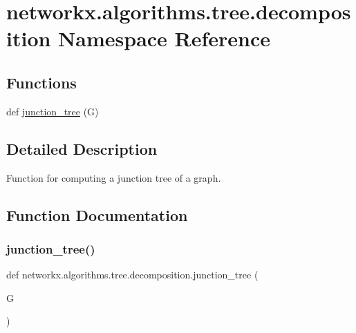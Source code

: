 \hypertarget{namespacenetworkx_1_1algorithms_1_1tree_1_1decomposition}{}\section{networkx.\+algorithms.\+tree.\+decomposition Namespace Reference}
\label{namespacenetworkx_1_1algorithms_1_1tree_1_1decomposition}
\subsection*{Functions}
\begin{DoxyCompactItemize}
\item 
def \hyperlink{namespacenetworkx_1_1algorithms_1_1tree_1_1decomposition_a91d970d1a653c7a4047624416258a661}{junction\+\_\+tree} (G)
\end{DoxyCompactItemize}


\subsection{Detailed Description}
\begin{DoxyVerb}Function for computing a junction tree of a graph.\end{DoxyVerb}
 

\subsection{Function Documentation}
\mbox{\label{namespacenetworkx_1_1algorithms_1_1tree_1_1decomposition_a91d970d1a653c7a4047624416258a661}} 
\subsubsection{\texorpdfstring{junction\+\_\+tree()}{junction\_tree()}}
{\footnotesize\ttfamily def networkx.\+algorithms.\+tree.\+decomposition.\+junction\+\_\+tree (\begin{DoxyParamCaption}\item[{}]{G }\end{DoxyParamCaption})}

